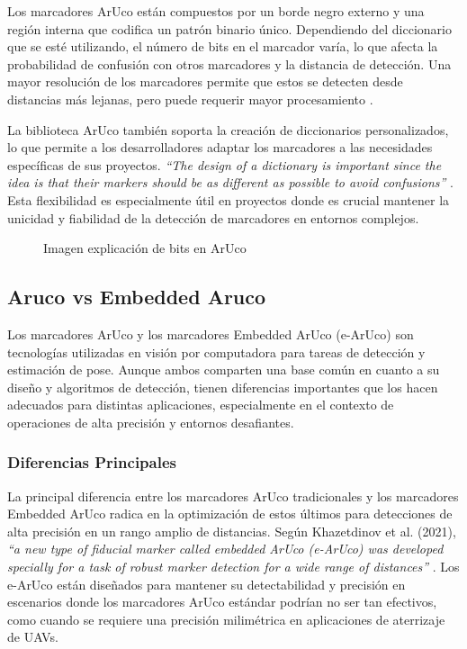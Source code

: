     Los marcadores ArUco están compuestos por un borde negro externo y una región interna que codifica un patrón binario único. Dependiendo del diccionario que se esté utilizando, el número de bits en el marcador varía, lo que afecta la probabilidad de confusión con otros marcadores y la distancia de detección. Una mayor resolución de los marcadores permite que estos se detecten desde distancias más lejanas, pero puede requerir mayor procesamiento \cite{aruco_docs}.

    La biblioteca ArUco también soporta la creación de diccionarios personalizados, lo que permite a los desarrolladores adaptar los marcadores a las necesidades específicas de sus proyectos. \textit{“The design of a dictionary is important since the idea is that their markers should be as different as possible to avoid confusions”} \cite{aruco_docs_pdf}. Esta flexibilidad es especialmente útil en proyectos donde es crucial mantener la unicidad y fiabilidad de la detección de marcadores en entornos complejos.

    \begin{figure}[h!] 
    \centering 
    \caption{Imagen explicación de bits en ArUco} 
    \label{fig} 
    \end{figure}

\subsection{Aruco vs Embedded Aruco}
    Los marcadores ArUco y los marcadores Embedded ArUco (e-ArUco) son tecnologías utilizadas en visión por computadora para tareas de detección y estimación de pose. Aunque ambos comparten una base común en cuanto a su diseño y algoritmos de detección, tienen diferencias importantes que los hacen adecuados para distintas aplicaciones, especialmente en el contexto de operaciones de alta precisión y entornos desafiantes.

    \subsubsection{Diferencias Principales}

    La principal diferencia entre los marcadores ArUco tradicionales y los marcadores Embedded ArUco radica en la optimización de estos últimos para detecciones de alta precisión en un rango amplio de distancias. Según Khazetdinov et al. (2021), \textit{“a new type of fiducial marker called embedded ArUco (e-ArUco) was developed specially for a task of robust marker detection for a wide range of distances”} \cite{khazetdinov2021}. Los e-ArUco están diseñados para mantener su detectabilidad y precisión en escenarios donde los marcadores ArUco estándar podrían no ser tan efectivos, como cuando se requiere una precisión milimétrica en aplicaciones de aterrizaje de UAVs.

